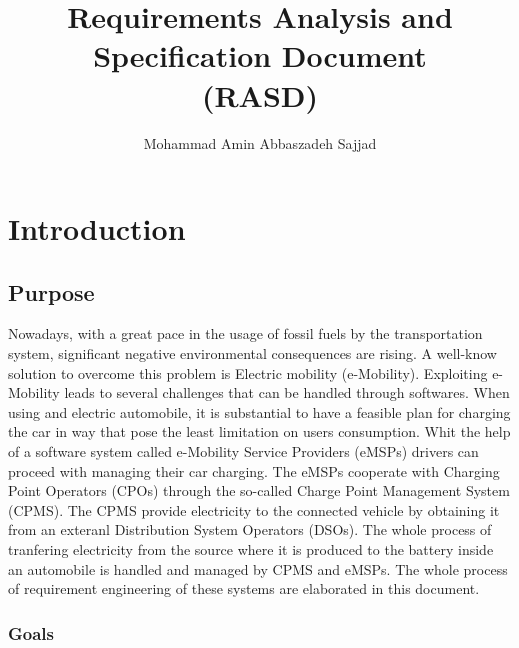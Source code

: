 \documentclass{article}
\title{Requirements Analysis and Specification Document\\(RASD)}
\author{Mohammad Amin Abbaszadeh 
Sajjad}
\date{\vspace{-5ex}}
\begin{document}
\maketitle
\doublespacing

\tableofcontents
\newpage
\section{Introduction}

\subsection{Purpose}

Nowadays, with a great pace in the usage of fossil fuels by the transportation system, significant negative environmental consequences are rising. A well-know solution to overcome this problem is Electric mobility (e-Mobility). Exploiting  e-Mobility leads to several challenges that can be handled through softwares. When using and electric automobile, it is substantial to have a feasible plan for charging the car in way that pose the least limitation on users consumption. Whit the help of a software system called e-Mobility Service Providers (eMSPs) drivers can proceed with managing their car charging. The eMSPs cooperate with  Charging Point Operators (CPOs) through the so-called Charge Point Management System (CPMS). The CPMS provide electricity to the connected vehicle by obtaining it from an exteranl Distribution System Operators (DSOs). The whole process of tranfering electricity from the source where it is produced to the battery inside an automobile is handled and managed by CPMS and eMSPs. 
The whole process of requirement engineering of these systems are elaborated in this document.

\subsubsection{Goals}
\vspace{0.2cm}
\end{document}
